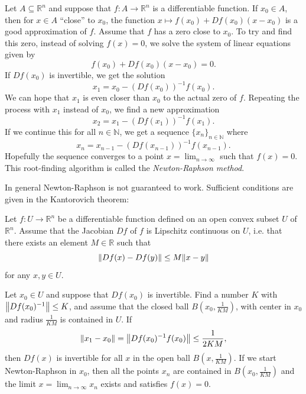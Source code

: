 Let $A\subseteq\mathbb{R}^n$ and suppose that $f\colon A \to\mathbb{R}^n$ is a differentiable function. If $x_0\in A$, then for $x\in A$ “close” to $x_0$, the function $x\mapsto f(x_0)+Df(x_0)(x-x_0)$ is a good approximation of $f$. Assume that $f$ has a zero close to $x_0$. To try and find this zero, instead of solving $f(x)=0$, we solve the system of linear equations given by
\begin{equation*}
  f(x_0)+Df(x_0)(x-x_0) = 0.
\end{equation*}
If $Df(x_0)$ is invertible, we get the solution
\begin{equation*}
  x_1=x_0-(Df(x_0))^{-1}f(x_0).
\end{equation*}
We can hope that $x_1$ is even closer than $x_0$ to the actual zero of $f$. Repeating the process with $x_1$ instead of $x_0$, we find a new approximation
\begin{equation*}
  x_2=x_1-(Df(x_1))^{-1}f(x_1).
\end{equation*}
If we continue this for all $n\in\mathbb{N}$, we get a sequence $\{x_n\}_{n\in\mathbb{N}}$ where
\begin{equation*}
  x_n=x_{n-1}-(Df(x_{n-1}))^{-1}f(x_{n-1}).
\end{equation*}
Hopefully the sequence converges to a point $x=\lim_{n\to\infty}$ such that $f(x)=0$. This root-finding algorithm is called the \emph{Newton-Raphson method}.

In general Newton-Raphson is not guaranteed to work. Sufficient conditions are given in the Kantorovich theorem:
\begin{theorem}
  Let $f\colon U\to\mathbb{R}^n$ be a differentiable function defined on an open convex subset $U$ of $\mathbb{R}^n$. Assume that the Jacobian $Df$ of $f$ is Lipschitz continuous on $U$, i.e. that there exists an element $M\in\mathbb{R}$ such that
  \begin{equation*}
    \norm{Df(x)-Df(y)}\le M\norm{x-y}
  \end{equation*}
  for any $x,y\in U$.

Let $x_0\in U$ and suppose that $Df(x_0)$ is invertible. Find a number $K$ with $\norm{Df(x_0)^{-1}}\le K$, and assume that the closed ball $B\left(x_0,\frac{1}{KM}\right)$, with center in $x_0$ and radius $\frac{1}{KM}$ is contained in $U$. If
\begin{equation*}
  \norm{x_1-x_0}=\norm{Df(x_0)^{-1}f(x_0)}\le\frac{1}{2KM},
\end{equation*}
then $Df(x)$ is invertible for all $x$ in the open ball $B\left(x,\frac{1}{KM}\right)$. If we start Newton-Raphson in $x_0$, then all the points $x_n$ are contained in $B\left(x_0,\frac{1}{KM}\right)$ and the limit $x=\lim_{n\to\infty}x_n$ exists and satisfies $f(x)=0$.
\end{theorem}

